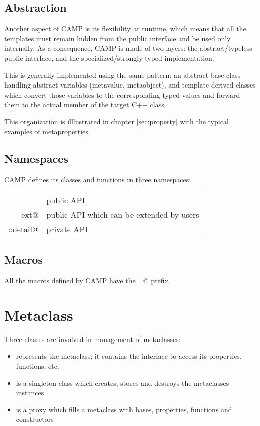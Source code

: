 \documentclass[a4paper, twoside]{report}
\begin{document}
\section{Abstraction}

	Another aspect of CAMP is its flexibility at runtime, which means that all the templates
	must remain hidden from the public interface and be used only internally. As a consequence,
	CAMP is made of two layers: the abstract/typeless public interface, and the specialized/strongly-typed
	implementation.
	
	This is generally implemented using the same pattern: an
	abstract base class handling abstract variables (metavalue, metaobject),
	and template derived classes which convert those variables to the corresponding typed values
	and forward them to the actual member of the target C++ class.
	
	This organization is illlustrated in
	chapter \ref{sec:property} with the typical examples of metaproperties.
	
\section{Namespaces}

	CAMP defines its classes and functions in three namespaces:
	
	\begin{tabular}{r|l}
		\verb@camp@         & public API \\
		\verb@camp_ext@     & public API which can be extended by users \\
		\verb@camp::detail@ & private API \\
	\end{tabular}

\section{Macros}

	All the macros defined by CAMP have the \verb@CAMP_@ prefix.

\chapter{Metaclass}

	Three classes are involved in management of metaclasses:
	
	\begin{itemize}
		\item \verb@Class@ represents the metaclass; it contains the interface to access its properties, functions, etc.
		\item \verb@ClassManager@ is a singleton class which creates, stores and destroys the metaclasses instances
		\item \verb@ClassBuilder@ is a proxy which fills a metaclass with bases, properties, functions and constructors
	\end{itemize}
	
\end{document}
